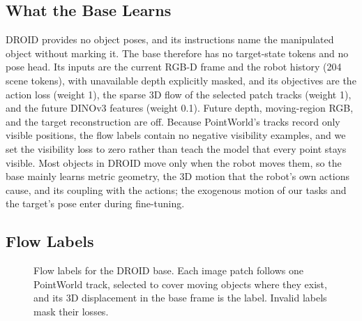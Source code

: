 \subsection{What the Base Learns}
\label{app:droid_target}
DROID provides no object poses, and its instructions name the manipulated object
without marking it. The base therefore has no target-state tokens and no pose head.
Its inputs are the current RGB-D frame and the robot history (204 scene tokens),
with unavailable depth explicitly masked, and its objectives are
the action loss (weight 1), the sparse 3D flow of the selected patch tracks (weight 1), and the
future DINOv3 features (weight 0.1). Future depth, moving-region RGB, and the target
reconstruction are off. Because PointWorld's tracks record only visible positions,
the flow labels contain no negative visibility examples, and we set the visibility
loss to zero rather than teach the model that every point stays visible. Most
objects in DROID move only when the robot moves them, so the base mainly learns
metric geometry, the 3D motion that the robot's own actions cause, and its coupling
with the actions; the exogenous motion of our tasks and the target's pose enter
during fine-tuning.

\subsection{Flow Labels}
\label{app:lifting}
\begin{figure}[t]
\centering
{}
\caption{Flow labels for the DROID base. Each image patch follows one PointWorld track, selected to cover moving objects where
they exist, and its 3D displacement in the base frame is the label. Invalid labels mask their losses.}
\label{fig:lifting}
\end{figure}

